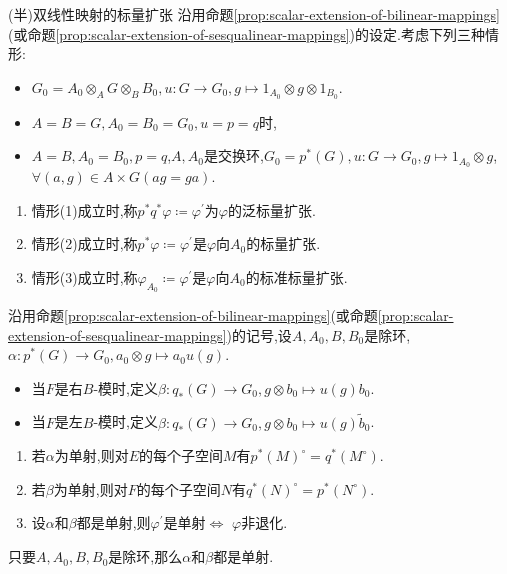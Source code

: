 \begin{definition}{(半)双线性映射的标量扩张}{}
	沿用命题\ref{prop:scalar-extension-of-bilinear-mappings}(或命题\ref{prop:scalar-extension-of-sesqualinear-mappings})的设定.考虑下列三种情形:
	\begin{itemize}
		\item $G_{0}=A_{0}\otimes_{A}G\otimes_{B}B_{0},u:G\to G_{0},g\mapsto 1_{A_{0}}\otimes g\otimes 1_{B_{0}}$.
		\item $A=B=G,A_{0}=B_{0}=G_{0},u=p=q$时,
		\item $A=B,A_{0}=B_{0},p=q$,$A,A_{0}$是交换环,$G_{0}=p^{\ast}\left(G\right),u:G\to G_{0},g\mapsto 1_{A_{0}}\otimes g$,$\forall \left(a,g\right)\in A\times G\left(ag=ga\right)$.
	\end{itemize}
	\begin{enumerate}
		\item 情形(1)成立时,称$p^{\ast}q^{\ast}\varphi\coloneq\varphi^{\prime}$为$\varphi$的泛标量扩张.
		\item 情形(2)成立时,称$p^{\ast}\varphi\coloneq\varphi^{\prime}$是$\varphi$向$A_{0}$的标量扩张.
		\item 情形(3)成立时,称$\varphi_{A_{0}}\coloneq\varphi^{\prime}$是$\varphi$向$A_{0}$的标准标量扩张.
	\end{enumerate}
\end{definition}

\begin{proposition}{}{}
	沿用命题\ref{prop:scalar-extension-of-bilinear-mappings}(或命题\ref{prop:scalar-extension-of-sesqualinear-mappings})的记号,设$A,A_{0},B,B_{0}$是除环,$\alpha:p^{\ast}\left(G\right)\to G_{0},a_{0}\otimes g\mapsto a_{0}u\left(g\right)$.
	\begin{itemize}
		\item 当$F$是右$B$-模时,定义$\beta:q_{\ast}\left(G\right)\to G_{0},g\otimes b_{0}\mapsto u\left(g\right)b_{0}$.
		\item 当$F$是左$B$-模时,定义$\beta:q_{\ast}\left(G\right)\to G_{0},g\otimes b_{0}\mapsto u\left(g\right)\tilde{b}_{0}$.
	\end{itemize}
	\begin{enumerate}
		\item 若$\alpha$为单射,则对$E$的每个子空间$M$有$p^{\ast}\left(M\right)^{\circ}=q^{\ast}\left(M^{\circ}\right)$.
		\item 若$\beta$为单射,则对$F$的每个子空间$N$有$q^{\ast}\left(N\right)^{\circ}=p^{\ast}\left(N^{\circ}\right)$.
		\item 设$\alpha$和$\beta$都是单射,则$\varphi^{\prime}$是单射$\iff$ $\varphi$非退化.
	\end{enumerate}
\end{proposition}

\begin{remark}{}{}
	只要$A,A_{0},B,B_{0}$是除环,那么$\alpha$和$\beta$都是单射.
\end{remark}
